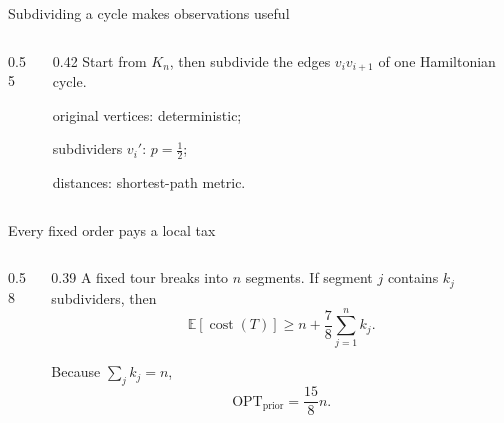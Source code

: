 \documentclass[aspectratio=169,12pt]{beamer}
\newcommand{\OPT}{\mathrm{OPT}}
\newcommand{\optprior}{\OPT_{\mathrm{prior}}}
\newcommand{\E}{\mathbb{E}}
\newcommand{\cost}{\operatorname{cost}}
\newcommand{\1}{\mathbf{1}}
\begin{document}
\begin{frame}{Subdividing a cycle makes observations useful}
  \begin{columns}[T,onlytextwidth]
    \begin{column}{0.55\textwidth}
      \centering
      \resizebox{!}{5.00cm}{\StCycleClique}
    \end{column}
    \begin{column}{0.42\textwidth}
      \vspace{0.42cm}
      Start from \(K_n\), then subdivide the edges
      \(v_i v_{i+1}\) of one Hamiltonian cycle.

      \vspace{0.38cm}
      \begin{sttightitemize}
        \item original vertices: deterministic;
        \item subdividers \(v_i'\): \(p=\tfrac12\);
        \item distances: shortest-path metric.
      \end{sttightitemize}

      \vspace{0.30cm}
    \end{column}
  \end{columns}
\end{frame}

\begin{frame}{Every fixed order pays a local tax}
  \begin{columns}[T,onlytextwidth]
    \begin{column}{0.58\textwidth}
      \centering
      \vspace{0.42cm}
      \resizebox{0.94\linewidth}{!}{\StSegmentTax}
    \end{column}
    \begin{column}{0.39\textwidth}
      A fixed tour breaks into \(n\) segments. If segment \(j\) contains
      \(k_j\) subdividers, then
      \[
        \E[\cost(T)]
        \ge n+\frac78\sum_{j=1}^{n}k_j.
      \]

      Because \(\sum_j k_j=n\),
      \[
        \boxed{\optprior=\frac{15}{8}n.}
      \]
    \end{column}
  \end{columns}
\end{frame}
\end{document}
